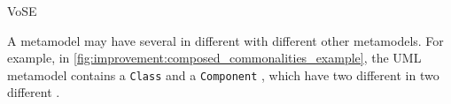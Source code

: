 \begin{copiedFrom}{VoSE}
%
%

A metamodel may have several \commonalities in different \conceptmetamodels with different other metamodels.
For example, in \autoref{fig:improvement:composed_commonalities_example}, the UML metamodel contains a \texttt{Class} and a \texttt{Component} \metaclass, which have two different \commonalities in two different \conceptmetamodels.


\end{copiedFrom}
